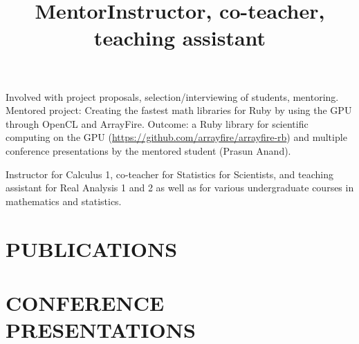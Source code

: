 \documentclass[overlapped, line, 10pt]{res} %
\begin{document}
\begin{resume}
\title{Mentor}
\begin{position}
  Involved with project proposals, selection/interviewing of students, mentoring. Mentored project: Creating the fastest math libraries for Ruby by using the GPU through OpenCL and ArrayFire. Outcome: a Ruby library for scientific computing on the GPU (\url{https://github.com/arrayfire/arrayfire-rb}) and multiple conference presentations by the mentored student (Prasun Anand).
\end{position}

\title{Instructor, co-teacher, teaching assistant}
\begin{position}
  Instructor for Calculus 1, co-teacher for Statistics for Scientists, and teaching assistant for Real Analysis 1 and 2 as well as for various undergraduate courses in mathematics and statistics.
\end{position}


\section{PUBLICATIONS}





\section{CONFERENCE PRESENTATIONS}


\end{resume}
\end{document}
